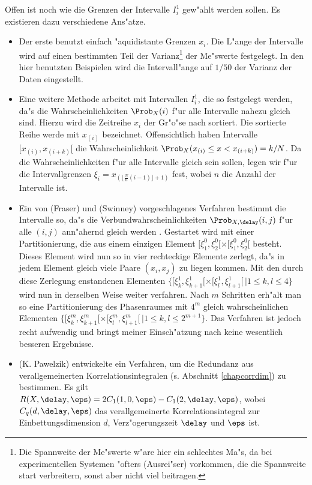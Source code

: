 Offen ist noch wie die Grenzen der Intervalle $I^1_i$ gew"ahlt werden sollen. Es
existieren dazu verschiedene Ans"atze.
\begin{itemize}
\item Der erste benutzt einfach "aquidistante Grenzen $x_i$. Die L"ange der Intervalle
  wird auf einen bestimmten Teil der Varianz\footnote{Die Spannweite der Me"swerte w"are
    hier ein schlechtes Ma"s, da bei experimentellen Systemen "ofters \slang(Ausrei"ser)
    vorkommen, die die Spannweite start verbreitern, sonst aber nicht viel beitragen.} der
  Me"swerte festgelegt. In den hier benutzten Beispielen wird die Intervall"ange auf
  $1/50$ der Varianz der Daten eingestellt.
\item Eine weitere Methode arbeitet mit Intervallen $I^1_i$, die so festgelegt werden,
  da"s die Wahrscheinlichkeiten $\Prob_X(i)$ f"ur alle Intervalle nahezu gleich sind.
  Hierzu wird die Zeitreihe $x_i$ der Gr"o"se nach sortiert. Die sortierte Reihe werde mit
  $x_{(i)}$ bezeichnet.  Offensichtlich haben Intervalle $[x_{(i)},x_{(i+k)}[$ die
  Wahrscheinlichkeit $\Prob_X(x_{(i)}\leq x<x_{(i+k)})=k/N$. Da die Wahrscheinlichkeiten
  f"ur alle Intervalle gleich sein sollen, legen wir f"ur die Intervallgrenzen
  $\xi_i=x_{(\lfloor\frac{N}{n}(i-1)\rfloor+1)}$ fest, wobei $n$ die Anzahl der Intervalle
  ist.
\item Ein von \autor(Fraser) und \autor(Swinney) vorgeschlagenes Verfahren bestimmt die
  Intervalle so, da"s die Verbundwahrscheinlichkeiten $\Prob_{X,\delay}(i,j)$ f"ur alle
  $(i,j)$ ann"ahernd gleich werden \cite{fraser-swinney}. Gestartet wird mit einer
  Partitionierung, die aus einem einzigen Element
  $[\xi^0_1,\xi^0_2[\times[\xi^0_1,\xi^0_2[$ besteht. Dieses Element wird nun so in vier
  rechteckige Elemente zerlegt, da"s in jedem Element gleich viele Paare $(x_i,x_j)$ zu
  liegen kommen. Mit den durch diese Zerlegung enstandenen Elementen $\{
  [\xi^1_k,\xi^1_{k+1} [ \times [\xi^1_l, \xi^1_{l+1} [ \, \vert 1 \leq k , l \leq 4\}$
  wird nun in derselben Weise weiter verfahren. Nach $m$ Schritten erh"alt man so eine
  Partitionierung des Phasenraumes mit $4^m$ gleich wahrscheinlichen Elementen
  $\{[\xi^m_k,\xi^m_{k+1}[\times[\xi^m_l,\xi^m_{l+1}[\,\vert 1\leq k,l \leq 2^{m+1}\}$.
  Das Verfahren ist jedoch recht aufwendig und bringt meiner Einsch"atzung nach keine
  wesentlich besseren Ergebnisse.
\item \autor(K. Pawelzik) entwickelte ein Verfahren, um die Redundanz aus
  verallgemeinerten Korrelationsintegralen (s. Abschnitt \ref{chapcorrdim}) zu bestimmen.
  Es gilt $R(X,\delay,\eps)=2C_1(1,0,\eps)-C_1(2,\delay,\eps)$, wobei $C_q(d,\delay,\eps)$
  das verallgemeinerte Korrelationsintegral zur Einbettungsdimension $d$,
  Verz"ogerungszeit $\delay$ und $\eps$ ist.
\end{itemize}


